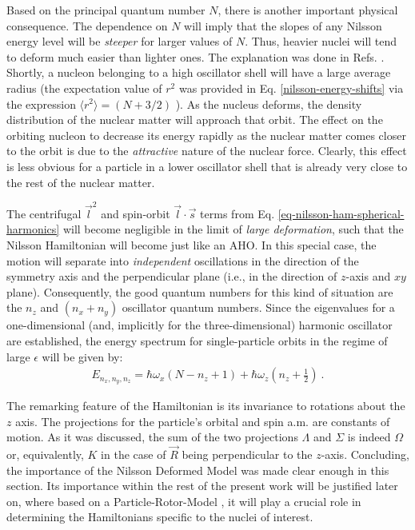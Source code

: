 Based on the principal quantum number $N$, there is another important physical consequence. The dependence on $N$ will imply that the slopes of any Nilsson energy level will be \emph{steeper} for larger values of $N$. Thus, heavier nuclei will tend to deform much easier than lighter ones. The explanation was done in Refs. \cite{bohr1998nuclear,krane1991introductory,casten2000nuclear}. Shortly, a nucleon belonging to a high oscillator shell will have a large average radius (the expectation value of $r^2$ was provided in Eq. \ref{nilsson-energy-shifts} via the expression $\langle r^2 \rangle=(N+3/2)$ \cite{bertulani2007nuclear}). As the nucleus deforms, the density distribution of the nuclear matter will approach that orbit. The effect on the orbiting nucleon to decrease its energy rapidly as the nuclear matter comes closer to the orbit is due to the \emph{attractive} nature of the nuclear force. 
Clearly, this effect is less obvious for a particle in a lower oscillator shell that is already very close to the rest of the nuclear matter.

The centrifugal $\vec{l}^2$ and spin-orbit $\vec{l}\cdot\vec{s}$ terms from Eq. \ref{eq-nilsson-ham-spherical-harmonics} will become negligible in the limit of \emph{large deformation}, such that the Nilsson Hamiltonian will become just like an AHO. In this special case, the motion will separate into \emph{independent} oscillations in the direction of the symmetry axis and the perpendicular plane (i.e., in the direction of $z$-axis and $xy$ plane). Consequently, the good quantum numbers for this kind of situation are the $n_z$ and $(n_x+n_y)$ oscillator quantum numbers. Since the eigenvalues for a one-dimensional (and, implicitly for the three-dimensional) harmonic oscillator are established, the energy spectrum for single-particle orbits in the regime of large $\epsilon$ will be given by:
\begin{align}
    E_{n_x,n_y,n_z}=\hbar\omega_x(N-n_z+1)+\hbar\omega_z\left(n_z+\frac{1}{2}\right)\ .
\end{align}

The remarking feature of the Hamiltonian is its invariance to rotations about the $z$ axis. The projections for the particle's orbital and spin a.m. are constants of motion. As it was discussed, the sum of the two projections $\Lambda$ and $\Sigma$ is indeed $\Omega$ or, equivalently, $K$ in the case of $\vec{R}$ being perpendicular to the $z$-axis. Concluding, the importance of the Nilsson Deformed Model was made clear enough in this section. Its importance within the rest of the present work will be justified later on, where based on a Particle-Rotor-Model \cite{bohr1998nuclear,davydov1958rotational}, it will play a crucial role in determining the Hamiltonians specific to the nuclei of interest.

